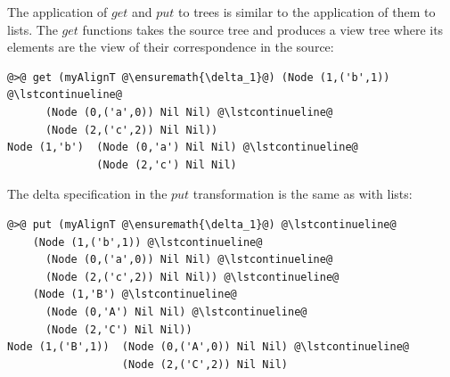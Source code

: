 \documentclass[preprint,numbers]{sigplanconf}
\newcommand{\Varid}[1]{\mathit{#1}}
\begin{document}
The application of \ensuremath{\Varid{get}} and \ensuremath{\Varid{put}} to trees is similar to the application of
them to lists. The \ensuremath{\Varid{get}} functions takes the source tree and produces a view
tree where its elements are the view of their correspondence in the source:
%
\begin{lstlisting}
@>@ get (myAlignT @\ensuremath{\delta_1}@) (Node (1,('b',1)) @\lstcontinueline@
      (Node (0,('a',0)) Nil Nil) @\lstcontinueline@
      (Node (2,('c',2)) Nil Nil))
Node (1,'b')  (Node (0,'a') Nil Nil) @\lstcontinueline@
              (Node (2,'c') Nil Nil)
\end{lstlisting}
%
The delta specification in the \ensuremath{\Varid{put}} transformation is the same as with lists:
%
\begin{lstlisting}
@>@ put (myAlignT @\ensuremath{\delta_1}@) @\lstcontinueline@
    (Node (1,('b',1)) @\lstcontinueline@
      (Node (0,('a',0)) Nil Nil) @\lstcontinueline@
      (Node (2,('c',2)) Nil Nil)) @\lstcontinueline@
    (Node (1,'B') @\lstcontinueline@
      (Node (0,'A') Nil Nil) @\lstcontinueline@
      (Node (2,'C') Nil Nil))
Node (1,('B',1))  (Node (0,('A',0)) Nil Nil) @\lstcontinueline@
                  (Node (2,('C',2)) Nil Nil)
\end{lstlisting}
\end{document}
